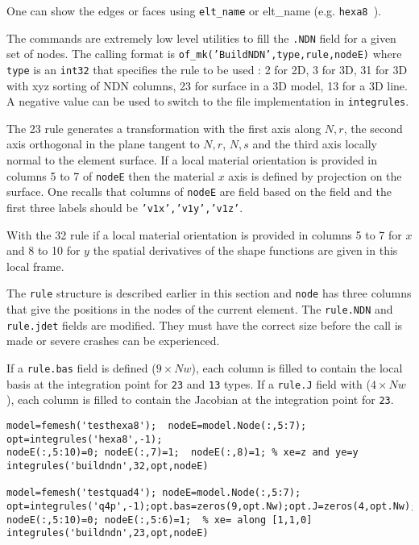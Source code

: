 One can show the edges or faces using {\tt {\ti elt\_name}}  or {\ti elt\_name}  (e.g. {\tt hexa8 }).


The commands are extremely low level utilities to fill the {\tt .NDN} field for a given set of nodes. The calling format is {\tt of\_mk('BuildNDN',type,rule,nodeE)} where {\tt type} is an {\tt int32} that specifies the rule to be used : 2 for 2D, 3 for 3D, 31 for 3D with xyz sorting of NDN columns, 23 for surface in a 3D model, 13 for a 3D line. A negative value can be used to switch to the  file implementation in {\tt integrules}. 

The 23 rule generates a transformation with the first axis along $N,r$, the second axis orthogonal in the plane tangent to $N,r$, $N,s$ and the third axis locally normal to the element surface. If a local material orientation is provided in columns 5 to 7 of {\tt nodeE} then the material $x$ axis is defined by projection on the surface. One recalls that columns of {\tt nodeE} are field based on the  field and the first three labels should be {\tt 'v1x','v1y','v1z'}.

With the 32 rule if a local material orientation is provided in columns 5 to 7 for $x$ and 8 to 10 for $y$ the spatial derivatives of the shape functions are given in this local frame. 

The {\tt rule} structure is described earlier in this section and {\tt node} has three columns that give the positions in the nodes of the current element. The {\tt rule.NDN} and {\tt rule.jdet} fields are modified. They must have the correct size before the call is made or severe crashes can be experienced.

If a {\tt rule.bas} field is defined ($9\times Nw$), each column is filled to contain the local basis at the integration point for {\tt 23} and {\tt 13} types. If a {\tt rule.J} field with ($4\times Nw$), each column is filled to contain the Jacobian at the integration point for {\tt 23}.

\begin{verbatim}
model=femesh('testhexa8');  nodeE=model.Node(:,5:7);
opt=integrules('hexa8',-1);
nodeE(:,5:10)=0; nodeE(:,7)=1;  nodeE(:,8)=1; % xe=z and ye=y
integrules('buildndn',32,opt,nodeE)

model=femesh('testquad4'); nodeE=model.Node(:,5:7);
opt=integrules('q4p',-1);opt.bas=zeros(9,opt.Nw);opt.J=zeros(4,opt.Nw);
nodeE(:,5:10)=0; nodeE(:,5:6)=1;  % xe= along [1,1,0]
integrules('buildndn',23,opt,nodeE)
\end{verbatim}%



